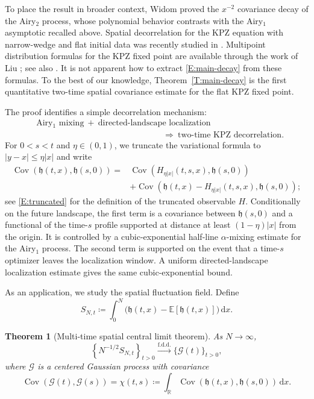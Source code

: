 \documentclass[12pt, reqno]{amsart}
\numberwithin{equation}{section}
\newtheorem{theorem}{Theorem}[section]
\theoremstyle{definition}
\newcommand{\R}{\mathbb{R}}
\newcommand{\E}{\mathbb{E}}
\newcommand{\h}{\mathfrak{h}}
\newcommand{\Cov}{\operatorname{Cov}}
\newcommand{\dd}{\,\mathrm{d}}
\begin{document}
To place the result in broader context, Widom \cite{widom:04:on} proved the
$x^{-2}$ covariance decay of the Airy$_2$ process, whose polynomial behavior
contrasts with the Airy$_1$ asymptotic recalled above. Spatial decorrelation for
the KPZ equation with narrow-wedge and flat initial data was recently studied in
\cite{gu.pu:25:spatial, chen.jimenez:26:spatial}. Multipoint distribution
formulas for the KPZ fixed point are available through the work of Liu
\cite{liu:22:multipoint}; see also \cite{johansson.rahman:21:multitime}. It is
not apparent how to extract \eqref{E:main-decay} from these formulas. To the
best of our knowledge, Theorem~\ref{T:main-decay} is the first quantitative
two-time spatial covariance estimate for the flat KPZ fixed point.

The proof identifies a simple decorrelation mechanism:
\begin{align*}
  & \text{Airy$_1$ mixing}\ +\ \text{directed-landscape localization}\ \\
  & \qquad\qquad\qquad \qquad  \qquad \qquad \qquad \quad  \Longrightarrow\
         \text{two-time KPZ decorrelation}.
\end{align*}
For $0<s<t$ and $\eta\in(0,1)$, we truncate the variational formula to
$|y-x|\le\eta|x|$ and write
\begin{align*}
  \Cov(\h(t,x),\h(s,0))
  ={} & \Cov(H_{\eta|x|}(t,s,x),\h(s,0)) \\
      & +\Cov(\h(t,x)-H_{\eta|x|}(t,s,x),\h(s,0));
\end{align*}
see \eqref{E:truncated} for the definition of the truncated observable $H$.
Conditionally on the future landscape, the first term is a covariance between
$\h(s,0)$ and a functional of the time-$s$ profile supported at distance at
least $(1-\eta)|x|$ from the origin. It is controlled by a cubic-exponential
half-line $\alpha$-mixing estimate for the Airy$_1$ process. The second term is
supported on the event that a time-$s$ optimizer leaves the localization window.
A uniform directed-landscape localization estimate gives the same
cubic-exponential bound.

As an application, we study the spatial fluctuation field. Define
\[
  S_{N,t} \coloneqq \int_0^N\big(\h(t,x)-\E[\h(t,x)]\big)\dd x.
\]

\begin{theorem}[Multi-time spatial central limit theorem]\label{T:CLT}
As $N\to\infty$,
\[
  \left\{N^{-1/2}S_{N,t}\right\}_{t>0}
  \xrightarrow{\mathrm{f.d.d.}}
  \{\mathcal G(t)\}_{t>0},
\]
where $\mathcal G$ is a centered Gaussian process with covariance
\begin{equation}\label{E:limit-covariance}
  \Cov(\mathcal G(t),\mathcal G(s))
  =\chi(t,s) \coloneqq \int_\R\Cov(\h(t,x),\h(s,0))\dd x.
\end{equation}
\end{theorem}
\end{document}
